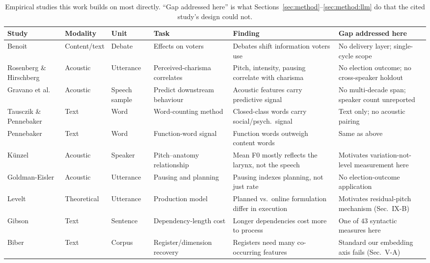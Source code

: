 \documentclass[journal]{IEEEtran}
\begin{document}
\begin{table}[t]
\caption{Empirical studies this work builds on most directly. ``Gap
addressed here'' is what Sections~\ref{sec:method}--\ref{sec:method:llm} do
that the cited study's design could not.}
\label{tab:related}
\centering
\footnotesize
\setlength{\tabcolsep}{4pt}
\begin{tabular}{p{}p{}p{}p{}p{}p{}}
\toprule
Study & Modality & Unit & Task & Finding & Gap addressed here \\
\midrule
Benoit \cite{benoit2014debates} & Content/text & Debate & Effects on voters & Debates shift information voters use & No delivery layer; single-cycle scope \\
Rosenberg \& Hirschberg \cite{rosenberg2009acoustic} & Acoustic & Utterance & Perceived-charisma correlates & Pitch, intensity, pausing correlate with charisma & No election outcome; no cross-speaker holdout \\
Gravano et al.\ \cite{hutto2018political} & Acoustic & Speech sample & Predict downstream behaviour & Acoustic features carry predictive signal & No multi-decade span; speaker count unreported \\
Tausczik \& Pennebaker \cite{tausczik2010psychological} & Text & Word & Word-counting method & Closed-class words carry social/psych.\ signal & Text only; no acoustic pairing \\
Pennebaker \cite{pennebaker2014small} & Text & Word & Function-word signal & Function words outweigh content words & Same as above \\
K\"unzel \cite{kunzel1989speakers} & Acoustic & Speaker & Pitch--anatomy relationship & Mean F0 mostly reflects the larynx, not the speech & Motivates variation-not-level measurement here \\
Goldman-Eisler \cite{goldman1968psycholinguistics} & Acoustic & Utterance & Pausing and planning & Pausing indexes planning, not just rate & No election-outcome application \\
Levelt \cite{levelt1989speaking} & Theoretical & Utterance & Production model & Planned vs.\ online formulation differ in execution & Motivates residual-pitch mechanism (Sec.~IX-B) \\
Gibson \cite{gibson1998linguistic} & Text & Sentence & Dependency-length cost & Longer dependencies cost more to process & One of $43$ syntactic measures here \\
Biber \cite{biber1988variation} & Text & Corpus & Register/dimension recovery & Registers need many co-occurring features & Standard our embedding axis fails (Sec.~V-A) \\
\bottomrule
\end{tabular}
\end{table}
\end{document}
